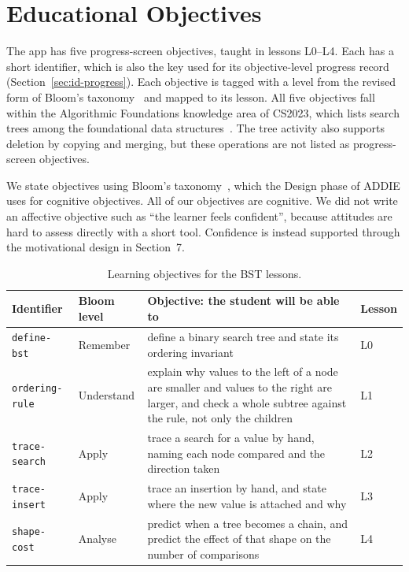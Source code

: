 \section{Educational Objectives}\label{sec:id-objectives}

The app has five progress-screen objectives, taught in lessons L0--L4. Each has a short identifier, which is also the key used for its objective-level progress record (Section~\ref{sec:id-progress}). Each objective is tagged with a level from the revised form of Bloom's
taxonomy~\cite{Bloom1956,Anderson2001} and mapped to its lesson. All five
objectives fall within the Algorithmic Foundations knowledge area of CS2023,
which lists search trees among the foundational data
structures~\cite{Kumar2024}. The tree activity also supports deletion by copying and merging, but these operations are not listed as progress-screen objectives.

We state objectives using Bloom's taxonomy~\cite{Bloom1956}, which the Design phase of ADDIE uses for cognitive objectives. All of our objectives are cognitive. We did not write an affective objective such as ``the learner feels confident'', because attitudes are hard to assess directly with a short tool. Confidence is instead supported through the motivational design in Section~7.

\begin{table}[H]
\centering
\small
\caption{Learning objectives for the BST lessons.}
\label{tab:objectives}
\begin{tabularx}{\textwidth}{p{2.6cm} p{2.0cm} X p{1.9cm}}
\toprule
Identifier & Bloom level & Objective: the student will be able to & Lesson \\
\midrule
\texttt{define-bst} & Remember & define a binary search tree and state its ordering invariant & L0 \\
\texttt{ordering-rule} & Understand & explain why values to the left of a node are smaller and values to the right are larger, and check a whole subtree against the rule, not only the children & L1 \\
\texttt{trace-search} & Apply & trace a search for a value by hand, naming each node compared and the direction taken & L2 \\
\texttt{trace-insert} & Apply & trace an insertion by hand, and state where the new value is attached and why & L3 \\
\texttt{shape-cost} & Analyse & predict when a tree becomes a chain, and predict the effect of that shape on the number of comparisons & L4 \\
\bottomrule
\end{tabularx}
\end{table}

